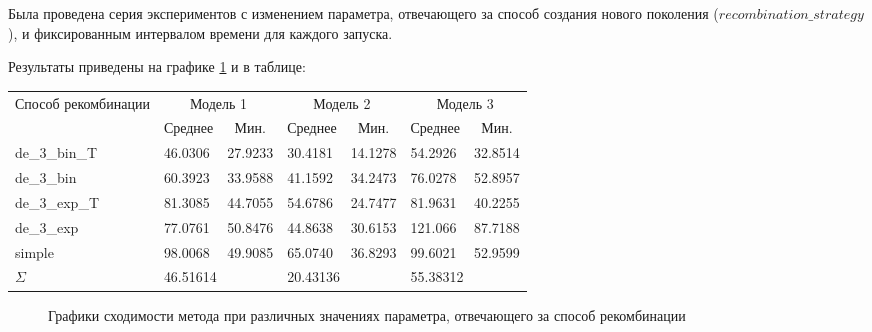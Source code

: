 \clearpage

Была проведена серия экспериментов с изменением параметра, отвечающего 
за способ создания нового поколения ($recombination\_strategy$), 
и фиксированным интервалом времени для каждого запуска. 

Результаты приведены на графике \ref{img:recombination} и в таблице:

\begin{table}[h]
\centering
\def\arraystretch{1.5} %
\begin{tabular}{|l|llllll|}
\hline %
  \multirow{2}{*}{Способ рекомбинации} & 
  \multicolumn{2}{c|}{Модель 1} & 
  \multicolumn{2}{c|}{Модель 2} & 
  \multicolumn{2}{c|}{Модель 3} \\ \cline{2-7} 
  & 
  \multicolumn{1}{c|}{Среднее} & 
  \multicolumn{1}{c|}{Мин.} & 
  \multicolumn{1}{c|}{Среднее} & 
  \multicolumn{1}{c|}{Мин.} & 
  \multicolumn{1}{c|}{Среднее} & 
  \multicolumn{1}{c|}{Мин.} \\ 
\hline %
  de\_3\_bin\_T & 46.0306 & 27.9233 & 30.4181 & 14.1278 & 54.2926 & 32.8514 \\ \cline{1-1}
  de\_3\_bin    & 60.3923 & 33.9588 & 41.1592 & 34.2473 & 76.0278 & 52.8957 \\ \cline{1-1}
  de\_3\_exp\_T & 81.3085 & 44.7055 & 54.6786 & 24.7477 & 81.9631 & 40.2255 \\ \cline{1-1}
  de\_3\_exp    & 77.0761 & 50.8476 & 44.8638 & 30.6153 & 121.066 & 87.7188 \\ \cline{1-1}
  simple        & 98.0068 & 49.9085 & 65.0740 & 36.8293 & 99.6021 & 52.9599 \\
\hline %
  \multicolumn{1}{|l|}{$\Sigma$} & 
  \multicolumn{2}{l|}{46.51614} & 
  \multicolumn{2}{l|}{20.43136} & 
  \multicolumn{2}{l|}{55.38312} \\ 
\hline %
\end{tabular}
\end{table}

\begin{figure}[h]
  \caption{Графики сходимости метода при различных значениях параметра, 
  отвечающего за способ рекомбинации}
  \label{img:recombination}
\end{figure}


\clearpage
